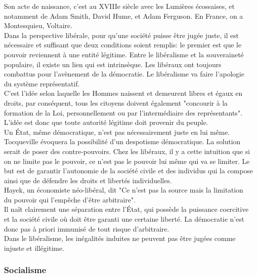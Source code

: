 \documentclass[10pt, a4paper, openany]{book}
\begin{document}
Son acte de naissance, c'est au XVIIIe siècle avec les Lumières écossaises, et notamment de Adam Smith, David Hume, et Adam Ferguson. En France, on a Montesquieu, Voltaire. \\
Dans la perspective libérale, pour qu'une société puisse être jugée juste, il est nécessaire et suffisant que deux conditions soient remplis: le premier est que le pouvoir reviennent à une entité légitime. Entre le libéralisme et la souveraineté populaire, il existe un lien qui est intrinsèque. Les libéraux ont toujours combattus pour l'avènement de la démocratie. Le libéralisme va faire l'apologie du système représentatif. \\
C'est l'idée selon laquelle les Hommes naissent et demeurent libres et égaux en droits, par conséquent, tous les citoyens doivent également "concourir à la formation de la Loi, personnellement ou par l'intermédiaire des représentants". L'idée est donc que toute autorité légitime doit provenir du peuple. \\
Un État, même démocratique, n'est pas nécessairement juste en lui même. Tocqueville évoquera la possibilité d'un despotisme démocratique. La solution serait de poser des contre-pouvoirs. Chez les libéraux, il y a cette intuition que si on ne limite pas le pouvoir, ce n'est pas le pouvoir lui même qui va se limiter. Le but est de garantir l'autonomie de la société civile et des individus qui la compose ainsi que de défendre les droits et libertés individuelles. \\
Hayek, un économiste néo-libéral, dit "Ce n'est pas la source mais la limitation du pouvoir qui l'empêche d'être arbitraire". \\
Il naît clairement une séparation entre l'État, qui possède la puissance coercitive et la société civile où doit être garanti une certaine liberté. La démocratie n'est donc pas à priori immunisé de tout risque d'arbitraire. \\
Dans le libéralisme, les inégalités induites ne peuvent pas être jugées comme injuste et illégitime. 

\subsubsection{Socialisme}
\end{document}
